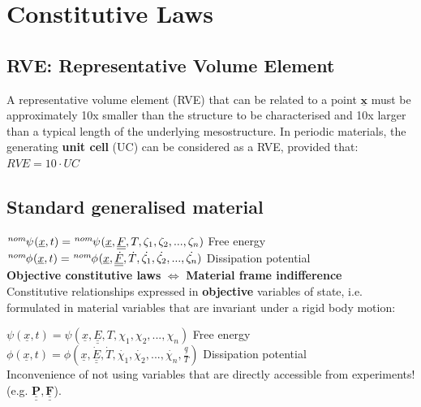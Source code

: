 \section{Constitutive Laws}
\subsection*{RVE: Representative Volume Element}
\smallskip

A representative volume element (RVE) that can be related to a point $\underline{\mathbf{x}}$ must be approximately 10x smaller than the structure to be characterised and 10x larger than a typical length of the underlying mesostructure. In periodic materials, the generating \textbf{unit cell} (UC) can be considered as a RVE, provided that: $RVE = 10 \cdot UC$ \\

\columnbreak
\subsection*{Standard generalised material}
$\tensor[^{nom}]{\psi}{} (\underline{x},t) = \tensor[^{nom}]{\psi}{} (\underline{x}, \underline{\underline{F}}, T, \zeta_1, \zeta_2, ..., \zeta_n)$ \qquad Free energy \\
$ \tensor[^{nom}]{\phi}{} (\underline{x},t) = \tensor[^{nom}]{\phi}{} (\underline{x}, \underline{\underline{\dot{F}}}, \dot{T}, \dot{\zeta_1}, \dot{\zeta_2}, ..., \dot{\zeta_n})$ \qquad Dissipation potential \\

\textbf{Objective constitutive laws} $\Leftrightarrow$ \textbf{Material frame indifference} \\
Constitutive relationships expressed in \textbf{objective} variables of state, i.e. formulated in material variables that are invariant under a rigid body motion:

$\psi (\underline{x},t) = \psi (\underline{x}, \underline{\underline{E}}, T, \chi_1, \chi_2, ..., \chi_n)$ \hspace{15.6mm}Free energy \\
$ \phi (\underline{x},t) = \phi (\underline{x}, \underline{\underline{\dot{E}}}, \dot{T}, \dot{\chi_1}, \dot{\chi_2}, ..., \dot{\chi_n}, \frac{\underline{q}}{T})$ \hspace{11.1mm} Dissipation potential\\

Inconvenience of not using variables that are directly accessible from experiments! (e.g. $\underline{\underline{\mathbf{P}}}, \underline{\underline{\mathbf{F}}}$). \\


